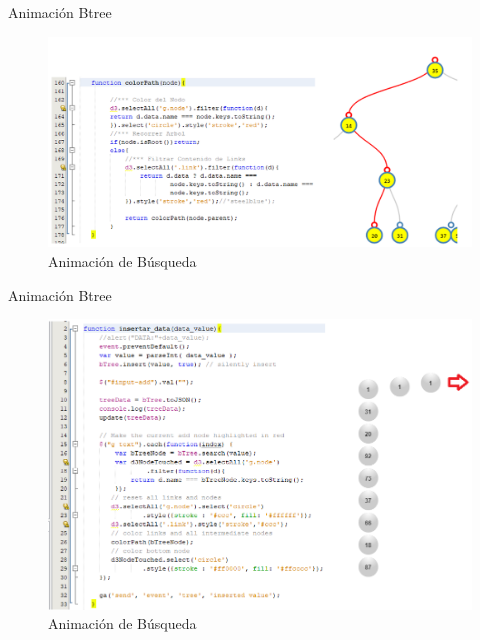\documentclass[11pt]{beamer}
\begin{document}
		\begin{frame}{Animación Btree}
			\justifying
			\begin{figure}[H]
				\centering
				\includegraphics[scale=0.45]{img/btree_ani_2.PNG}
				\caption{Animación de Búsqueda}
				\label{fig:btree_ani_2}
			\end{figure}
		\end{frame}
		
		\begin{frame}{Animación Btree}
			\justifying
			\begin{figure}[H]
				\centering
				\includegraphics[scale=0.45]{img/btree_ani_3.PNG}
				\caption{Animación de Búsqueda}
				\label{fig:btree_ani_3}
			\end{figure}
		\end{frame}
		
		
		
\end{document}
